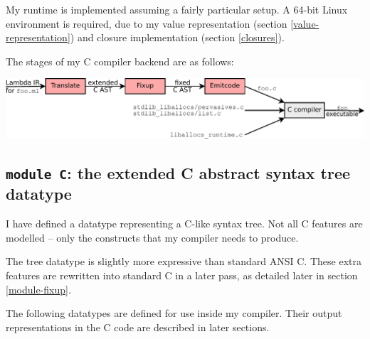 \documentclass[12pt,a4paper,twoside,openright]{report}
\begin{document}
My runtime is implemented assuming a fairly particular setup. A 64-bit
Linux environment is required, due to my value representation (section
\ref{value-representation}) and closure implementation (section
\ref{closures}).

The stages of my C compiler backend are as follows:

\begin{center}
  \includegraphics[width=16cm]{compiler_structure}
\end{center}

\subsection{\texttt{module C}: the extended C abstract syntax tree datatype}\label{module-c}

I have defined a datatype representing a C-like syntax tree. Not all C features
are modelled -- only the constructs that my compiler needs to produce.

The tree datatype is slightly more expressive than standard ANSI C. These extra
features are rewritten into standard C in a later pass, as detailed later in
section \ref{module-fixup}.

The following datatypes are defined for use inside my compiler. Their output representations in the C code are described in later sections.
\end{document}
